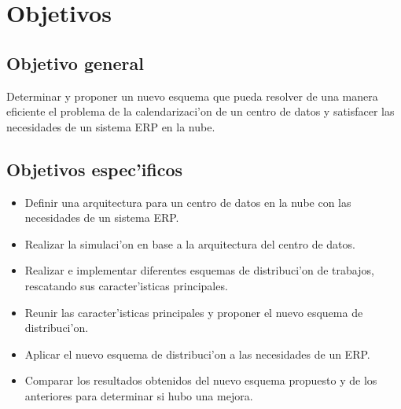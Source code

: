 
\chapter*{Objetivos}

\section*{Objetivo general}


Determinar y proponer un nuevo esquema que pueda resolver de una manera eficiente el problema de la calendarizaci'on de un centro de datos y satisfacer las necesidades de un sistema ERP en la nube.


\section*{Objetivos espec'ificos}


\begin{itemize}
\item Definir una arquitectura para un centro de datos en la nube con las necesidades de un sistema ERP.
\item Realizar la simulaci'on en base a la arquitectura del centro de datos.
\item Realizar e implementar diferentes esquemas de distribuci'on de trabajos, rescatando sus caracter'isticas principales.
\item Reunir las caracter'isticas principales y proponer el nuevo esquema de distribuci'on.
\item Aplicar el nuevo esquema de distribuci'on a las necesidades de un ERP.
\item Comparar los resultados obtenidos del nuevo esquema propuesto y de los anteriores para determinar si hubo una mejora.
\end{itemize}
